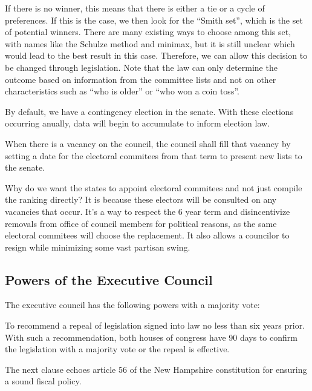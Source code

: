 \documentclass{article}
\begin{document}
If there is no winner, this means that there is either a tie or a cycle of preferences. If this is the case, we then look for the “Smith set”\cite{Smith_set}, which is the set of potential winners. There are many existing ways to choose among this set, with names like the Schulze method\cite{Schulze} and minimax, but it is still unclear which would lead to the best result in this case. Therefore, we can allow this decision to be changed through legislation. Note that the law can only determine the outcome based on information from the committee lists and not on other characteristics such as “who is older” or “who won a coin toss”.

By default, we have a contingency election in the senate. With these elections occurring anually, data will begin to accumulate to inform election law.

\begin{quoting}
When there is a vacancy on the council, the council shall fill that vacancy by setting a date for the electoral commitees from that term to present new lists to the senate.
\end{quoting}

Why do we want the states to appoint electoral commitees and not just compile the ranking directly? It is because these electors will be consulted on any vacancies that occur. It’s a way to respect the 6 year term and disincentivize removals from office of council members for political reasons, as the same electoral commitees will choose the replacement. It also allows a councilor to resign while minimizing some vast partisan swing.

\subsection{Powers of the Executive Council}

\begin{quoting}
The executive council has the following powers with a majority vote:

To recommend a repeal of legislation signed into law no less than six years prior. With such a recommendation, both houses of congress have 90 days to confirm the legislation with a majority vote or the repeal is effective.
\end{quoting}

The next clause echoes article 56 of the New Hampshire constitution\cite{New Hampshire Constitution} for ensuring a sound fiscal policy.
\end{document}

